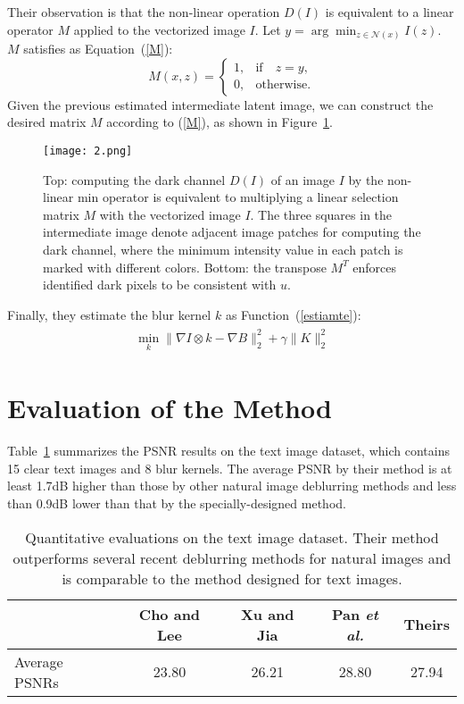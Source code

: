 \documentclass[twocolumn]{article}
\begin{document}
	Their observation is that the non-linear operation $D(I)$ is equivalent
	to a linear operator $M$ applied to the vectorized image $I$. Let $y=\arg \min_{z\in\mathcal{N}(x)}I(z)$. $M$ satisfies as Equation~(\ref{M}):
	\begin{equation}
	M(x,z)=
	\begin{cases}
	1, & \mbox{if} \quad z=y, \\
	0, & \mbox{otherwise}.
	\end{cases}      \label{M}
	\end{equation}
	Given the previous estimated intermediate latent image, we can construct the desired matrix $M$ according to (\ref{M}), as shown in Figure~\ref{fig2}.
	\begin{figure}[htbp] 
		\centering
		\texttt{[image: 2.png]} 
		\caption{Top: computing the dark channel $D(I)$ of an image $I$ by the non-linear min operator is equivalent to multiplying a linear selection matrix $M$ with the vectorized image $I$. The three squares in the intermediate image denote adjacent image patches for computing the dark channel, where the minimum intensity value in each patch is marked with different colors. Bottom: the transpose $M^T$ enforces identified dark pixels to be consistent with $u$.}\label{fig2}  
	\end{figure}
	Finally, they estimate the blur kernel $k$ as Function~(\ref{estiamte}):
	\begin{equation}
	\begin{aligned}
	\begin{split}
	\min_k \parallel \nabla I\otimes k-\nabla B \parallel_2^2+\gamma \parallel K \parallel_2^2 \label{estiamte}
	\end{split}
	\end{aligned}
	\end{equation}

 \section{Evaluation of the Method}
   Table~\ref{Quantitative} summarizes the PSNR results on the text image dataset\cite{Pan2014Deblurring}, which contains 15 clear text images and 8 blur kernels. The average PSNR by their method is at least 1.7dB higher than those by other natural image deblurring methods and less than 0.9dB lower than that by the specially-designed method.
   \begin{table}[h]
   	\centering
   	\caption{Quantitative evaluations on the text image dataset\cite{Pan2014Deblurring}. Their method outperforms several recent deblurring methods for natural images and is comparable to the method designed for text images.}\label{Quantitative}
   	\begin{tabular}{|p{1cm}|c|c|c|c|}
   		\hline
   		& Cho and Lee& Xu and Jia & Pan \emph{et al.}\cite{Pan2014Deblurring}& Theirs\\
   		\hline
   		Average PSNRs  &23.80 &26.21& 28.80 &27.94\\
   		\hline
   	\end{tabular}
   \end{table}
  

	
\end{document}
